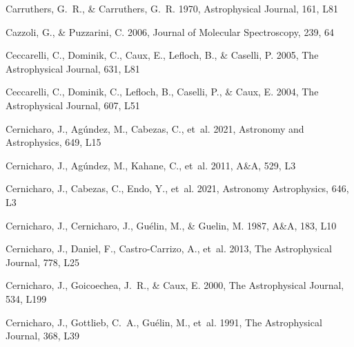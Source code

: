 \documentclass[twocolumn]{aastex631}
\begin{document}
\begin{thebibliography}{}
Carruthers, G.~R., \& Carruthers, G.~R. 1970, Astrophysical Journal, 161, L81

Cazzoli, G., \& Puzzarini, C. 2006, Journal of Molecular Spectroscopy, 239, 64

Ceccarelli, C., Dominik, C., Caux, E., Lefloch, B., \& Caselli, P. 2005, The
  Astrophysical Journal, 631, L81

Ceccarelli, C., Dominik, C., Lefloch, B., Caselli, P., \& Caux, E. 2004, The
  Astrophysical Journal, 607, L51

Cernicharo, J., Ag{\'u}ndez, M., Cabezas, C., {et~al.} 2021{},
  Astronomy and Astrophysics, 649, L15

Cernicharo, J., Ag{\'u}ndez, M., Kahane, C., {et~al.} 2011, A{\&}A, 529, L3

Cernicharo, J., Cabezas, C., Endo, Y., {et~al.} 2021{}, Astronomy
  Astrophysics, 646, L3

Cernicharo, J., Cernicharo, J., Gu{\'e}lin, M., \& Guelin, M.
  1987{}, A{\&}A, 183, L10

Cernicharo, J., Daniel, F., Castro-Carrizo, A., {et~al.} 2013{},
  The Astrophysical Journal, 778, L25

Cernicharo, J., Goicoechea, J.~R., \& Caux, E. 2000, The Astrophysical Journal,
  534, L199

Cernicharo, J., Gottlieb, C.~A., Gu{\'e}lin, M., {et~al.} 1991{},
  The Astrophysical Journal, 368, L39


\end{thebibliography}
\end{document}
